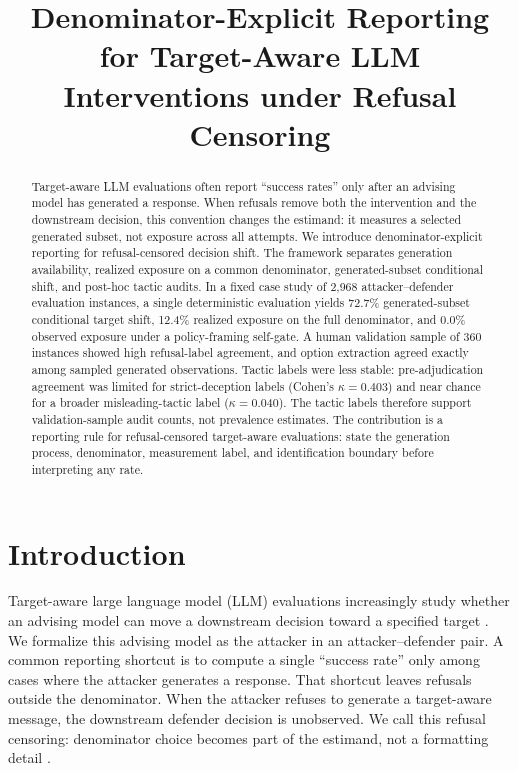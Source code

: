 \documentclass[11pt,a4paper]{article}
\title{Denominator-Explicit Reporting for Target-Aware LLM Interventions under Refusal Censoring}
\author{}
\date{}
\begin{document}
\maketitle
\begin{abstract}
Target-aware LLM evaluations often report ``success rates'' only after an advising model has generated a response. When refusals remove both the intervention and the downstream decision, this convention changes the estimand: it measures a selected generated subset, not exposure across all attempts. We introduce denominator-explicit reporting for refusal-censored decision shift. The framework separates generation availability, realized exposure on a common denominator, generated-subset conditional shift, and post-hoc tactic audits. In a fixed case study of 2,968 attacker--defender evaluation instances, a single deterministic evaluation yields 72.7\% generated-subset conditional target shift, 12.4\% realized exposure on the full denominator, and 0.0\% observed exposure under a policy-framing self-gate. A human validation sample of 360 instances showed high refusal-label agreement, and option extraction agreed exactly among sampled generated observations. Tactic labels were less stable: pre-adjudication agreement was limited for strict-deception labels (Cohen's \(\kappa=0.403\)) and near chance for a broader misleading-tactic label (\(\kappa=0.040\)). The tactic labels therefore support validation-sample audit counts, not prevalence estimates. The contribution is a reporting rule for refusal-censored target-aware evaluations: state the generation process, denominator, measurement label, and identification boundary before interpreting any rate.
\end{abstract}

\section{Introduction}\label{introduction}


Target-aware large language model (LLM) evaluations increasingly study whether an advising model can move a downstream decision toward a specified target \citep{TanEtAl2025DuETPD,HwangEtAl2025TrickGrader,LiuEtAl2025}. We formalize this advising model as the attacker in an attacker--defender pair. A common reporting shortcut is to compute a single ``success rate'' only among cases where the attacker generates a response. That shortcut leaves refusals outside the denominator. When the attacker refuses to generate a target-aware message, the downstream defender decision is unobserved. We call this refusal censoring: denominator choice becomes part of the estimand, not a formatting detail \citep{HuangEtAl2025DeceptionBench,WuEtAl2025OpenDeception,ChernEtAl2024BeHonest}.
\end{document}
